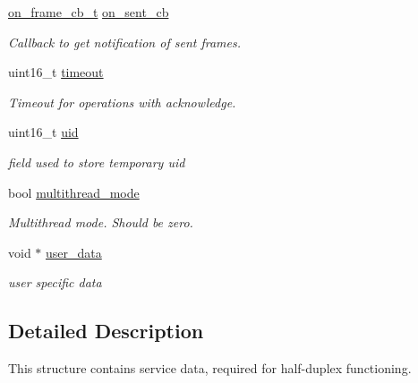 \begin{DoxyCompactItemize}
\hyperlink{tiny__types_8h_ad6bf709565b8aecb9e6ecf196f219d54}{on\+\_\+frame\+\_\+cb\+\_\+t} \hyperlink{structSTinyHdData___a159a56591682bfb0ff6c5020b26590f6}{on\+\_\+sent\+\_\+cb}
\begin{DoxyCompactList}\small\item\em Callback to get notification of sent frames. \end{DoxyCompactList}\item 
\mbox{\label{structSTinyHdData___a7ca4e5b23cf480d93317245010bcbe73}} 
uint16\+\_\+t \hyperlink{structSTinyHdData___a7ca4e5b23cf480d93317245010bcbe73}{timeout}
\begin{DoxyCompactList}\small\item\em Timeout for operations with acknowledge. \end{DoxyCompactList}\item 
\mbox{\label{structSTinyHdData___a7084eac08b744ad0aa2624b854866825}} 
uint16\+\_\+t \hyperlink{structSTinyHdData___a7084eac08b744ad0aa2624b854866825}{uid}
\begin{DoxyCompactList}\small\item\em field used to store temporary uid \end{DoxyCompactList}\item 
bool \hyperlink{structSTinyHdData___afb1a42e064291b2775024b20d4c9eb79}{multithread\+\_\+mode}
\begin{DoxyCompactList}\small\item\em Multithread mode. Should be zero. \end{DoxyCompactList}\item 
\mbox{\label{structSTinyHdData___a29d80bd96abfa9640bb5c0824416f836}} 
void $\ast$ \hyperlink{structSTinyHdData___a29d80bd96abfa9640bb5c0824416f836}{user\+\_\+data}
\begin{DoxyCompactList}\small\item\em user specific data \end{DoxyCompactList}\end{DoxyCompactItemize}


\subsection{Detailed Description}
This structure contains service data, required for half-\/duplex functioning. 

